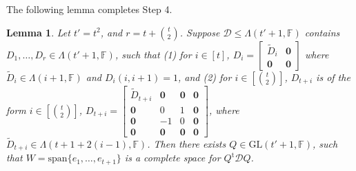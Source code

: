 \documentclass[10pt]{article}
\newtheorem{lemma}[theorem]{Lemma}
\newcommand{\tuple}[1]{\mathbf{#1}}
\newcommand{\spa}[1]{\mathcal{#1}}
\newcommand{\GL}{\mathrm{GL}}
\newcommand{\F}{\mathbb{F}}
\renewcommand{\span}{\mathrm{span}}
\newcommand{\cD}{\spa{D}}
\newcommand{\vzero}{\tuple{0}}
\newcommand{\tr}[1]{#1^{\mathrm{t}}}
\begin{document}
The following lemma completes Step 4. 
\begin{lemma}\label{lem:step4}
Let $t'=t^2$, and $r=t+\binom{t}{2}$.
Suppose $\cD\leq \Lambda(t'+1, 
\F)$ contains 
$D_1, 
\dots, D_r\in \Lambda(t'+1, \F)$, such that (1) for $i\in [t]$, 
$D_i=\begin{bmatrix}
\tilde D_i & \vzero \\
\vzero & \vzero 
\end{bmatrix}$ where $\tilde D_i\in \Lambda(i+1, \F)$ and $D_i(i, i+1)=1$, 
and 
(2) for 
$i\in[\binom{t}{2}]$, $D_{t+i}$ is of the form
%
%
%
%
%
%
$i\in[\binom{t}{2}]$, $D_{t+i}=\begin{bmatrix}
\tilde D_{t+i} & \vzero & \vzero & \vzero \\
\vzero & 0 & 1 & \vzero \\
\vzero & -1 & 0 & \vzero \\
\vzero & \vzero & \vzero & \vzero 
\end{bmatrix}$,
where $\tilde D_{t+i}\in\Lambda(t+1+2(i-1), \F)$. Then there exists $Q\in\GL(t'+1, 
\F)$, such that $W=\span\{ e_1, \dots, e_{t+1}\}$ is a complete space for 
$\tr{Q}\cD Q$. 
\end{lemma}
\end{document}
